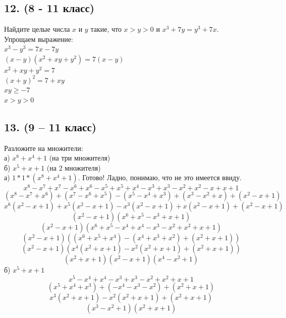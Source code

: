 \documentclass[a4paper,12pt]{article} %
\begin{document}
	\subsection*{12. (8 - 11 класс)}{Найдите целые числа $x$ и $y$ такие, что $x>y>0$ и $x^3+7y=y^3+7x$.\\
		
		Упрощаем выражение: \\
		$x^3-y^3=7x-7y$\\
		$(x-y)(x^2+xy+y^2)=7(x-y)$\\
		$x^2+xy+y^2=7$\\
		$(x+y)^2=7+xy$\\
		$xy\geq-7$\\
		$x>y>0$\\
	}
	\subsection*{13. (9 – 11 класс)}{Разложите на множители:\\а) $x^8+x^4+1$ (на три множителя)\\б) $x^5+x+1$ (на 2 множителя)\\
		
		а) $1*1*(x^8+x^4+1)$. Готово! Ладно, понимаю, что не это имеется ввиду. 
		$$x^8-x^7+x^7-x^6+x^6-x^5+x^5+x^4-x^3+x^3-x^2+x^2-x+x+1$$
		$$(x^8-x^7+x^6)+(x^7-x^6+x^5)-(x^5-x^4+x^3)+(x^3-x^2+x)+(x^2-x+1)$$
		$$x^6(x^2-x+1)+x^5(x^2-x+1)-x^3(x^2-x+1)+x(x^2-x+1)+(x^2-x+1)$$
		$$(x^2-x+1)(x^6+x^5-x^3+x+1)$$
		$$(x^2-x+1)(x^6+x^5-x^4+x^4-x^3-x^2+x^2+x+1)$$
		$$(x^2-x+1)((x^6+x^5+x^4)-(x^4+x^3+x^2)+(x^2+x+1))$$
		$$(x^2-x+1)(x^4(x^2+x+1)-x^2(x^2+x+1)+(x^2+x+1))$$
		$$(x^2+x+1)(x^2-x+1)(x^4-x^2+1)$$
		б) $x^5+x+1$
		$$x^5-x^4+x^4-x^3+x^3-x^2+x^2+x+1$$
		$$(x^5+x^4+x^3)+(-x^4-x^3-x^2)+(x^2+x+1)$$
		$$x^3(x^2+x+1)-x^2(x^2+x+1)+(x^2+x+1)$$
		$$(x^3-x^2+1)(x^2+x+1)$$
	}
\end{document}
